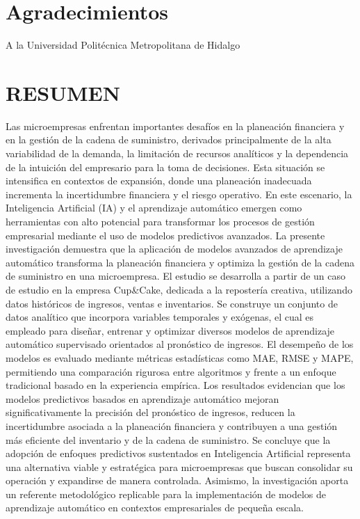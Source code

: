 \documentclass[12pt]{book}
\begin{document}
\chapter*{Agradecimientos}
A la Universidad Politécnica Metropolitana de Hidalgo
\tableofcontents
\mainmatter
\onehalfspacing{}
\chapter{RESUMEN}
Las microempresas enfrentan importantes desafíos en la planeación financiera y en la gestión de la cadena de suministro, derivados principalmente de la alta variabilidad de la demanda, la limitación de recursos analíticos y la dependencia de la intuición del empresario para la toma de decisiones. Esta situación se intensifica en contextos de expansión, donde una planeación inadecuada incrementa la incertidumbre financiera y el riesgo operativo. En este escenario, la Inteligencia Artificial (IA) y el aprendizaje automático emergen como herramientas con alto potencial para transformar los procesos de gestión empresarial mediante el uso de modelos predictivos avanzados.
La presente investigación demuestra que la aplicación de modelos avanzados de aprendizaje automático transforma la planeación financiera y optimiza la gestión de la cadena de suministro en una microempresa. El estudio se desarrolla a partir de un caso de estudio en la empresa Cup&Cake, dedicada a la repostería creativa, utilizando datos históricos de ingresos, ventas e inventarios. Se construye un conjunto de datos analítico que incorpora variables temporales y exógenas, el cual es empleado para diseñar, entrenar y optimizar diversos modelos de aprendizaje automático supervisado orientados al pronóstico de ingresos.
El desempeño de los modelos es evaluado mediante métricas estadísticas como MAE, RMSE y MAPE, permitiendo una comparación rigurosa entre algoritmos y frente a un enfoque tradicional basado en la experiencia empírica. Los resultados evidencian que los modelos predictivos basados en aprendizaje automático mejoran significativamente la precisión del pronóstico de ingresos, reducen la incertidumbre asociada a la planeación financiera y contribuyen a una gestión más eficiente del inventario y de la cadena de suministro.
Se concluye que la adopción de enfoques predictivos sustentados en Inteligencia Artificial representa una alternativa viable y estratégica para microempresas que buscan consolidar su operación y expandirse de manera controlada. Asimismo, la investigación aporta un referente metodológico replicable para la implementación de modelos de aprendizaje automático en contextos empresariales de pequeña escala.
\end{document}
